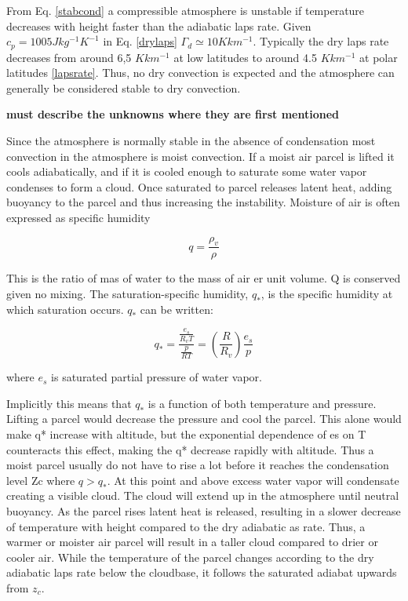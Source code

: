 From Eq. \eqref{stabcond} a compressible atmosphere is unstable if temperature decreases with height faster than the adiabatic laps rate. Given $c_p = 1005 Jkg^{-1}K^{-1}$ in Eq. \eqref{drylaps} $\Gamma_d \simeq 10 K km^{-1}$. Typically the dry laps rate decreases from around 6,5 $K km^{-1}$ at low latitudes to around 4.5 $K km^{-1}$ at polar latitudes \ref{lapsrate}. Thus, no dry convection is expected and the atmosphere can generally be considered stable to dry convection.     

\textbf{must describe the unknowns where they are first mentioned}


Since the atmosphere is normally stable in the absence of condensation most convection in the atmosphere is moist convection. If a moist air parcel is lifted it cools adiabatically, and if it is cooled enough to saturate some water vapor condenses to form a cloud. Once saturated to parcel releases latent heat, adding buoyancy to the parcel and thus increasing the instability.
Moisture of air is often expressed as specific humidity 

\begin{equation}
    q = \frac{\rho_v}{\rho}
\end{equation}

This is the ratio of mas of water to the mass of air er unit volume. Q is conserved given no mixing. The saturation-specific humidity, $q_*$, is the specific humidity at which saturation occurs. $q_*$ can be written:

\begin{equation}
    q_* = \frac{\frac{e_s}{R_v T}}{\frac{p}{RT}} = \left(\frac{R}{R_v}\right)\frac{e_s}{p}
    \label{qnote}
\end{equation}

where $e_s$ is saturated partial pressure of water vapor. 

Implicitly this means that $q_*$ is a function of both temperature and pressure. Lifting a parcel would decrease the pressure and cool the parcel. This alone would make q* increase with altitude, but the exponential dependence of es on T counteracts this effect, making the q* decrease rapidly with altitude. Thus a moist parcel usually do not have to rise a lot before it reaches the condensation level Zc where $q>q_*$. At this point and above excess water vapor will condensate creating a visible cloud. The cloud will extend up in the atmosphere until neutral buoyancy. As the parcel rises latent heat is released, resulting in a slower decrease of temperature with height compared to the dry adiabatic as rate.  Thus, a warmer or moister air parcel will result in a taller cloud compared to drier or cooler air. While the temperature of the parcel changes according to the dry adiabatic laps rate below the cloudbase, it follows the saturated adiabat upwards from $z_c$. 

